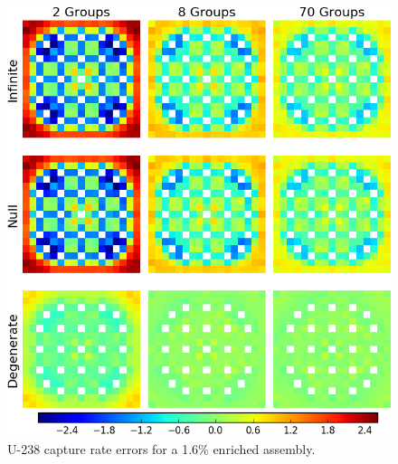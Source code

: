 \begin{figure}[h!]
\centering
\includegraphics[width=\linewidth]{figures/quantification/assm-16/capt-err}
\caption[U-238 capture rate errors for a 1.6\% enriched assembly]{U-238 capture rate errors for a 1.6\% enriched assembly.}
\label{fig:chap8-assm-1.6-capt-err}
\end{figure}

